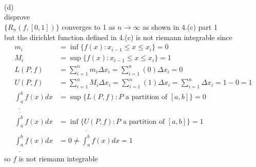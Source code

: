 \documentclass[12pt, border = 4pt, multi]{article} %
\begin{document}
\\
\\
\\
(d)\\
disprove\\
$\{R_n(f, [0, 1])\}$ converges to 1 as $n \rightarrow \infty$ as shown in 4.(c) part 1\\
but the dirichlet function defined in 4.(c) is not riemann integrable since
\begin{align*}
m_i &= \inf\{f(x): x_{i - 1} \leq x \leq x_i\} = 0\\
M_i &= \sup\{f(x): x_{i - 1} \leq x \leq x_i\} = 1\\
L(P, f) &= \sum_{i = 1} ^ n m_i \Delta x_i = \sum_{i = 1} ^ n (0)\Delta x_i = 0\\
U(P, f) &= \sum_{i = 1} ^ n M_i \Delta x_i = \sum_{i = 1} ^ n (1)\Delta x_i = \sum_{i = 1} ^ n \Delta x_i = 1 - 0 = 1\\
\underline{\int_a ^ b}f(x)dx &= \sup\{L(P, f): P \text{ a partition of }[a, b]\} = 0\\
\overline{\int_a ^ b}f(x)dx &= \inf\{U(P, f): P \text{ a partition of }[a, b]\} = 1\\
\underline{\int_a ^ b}f(x)dx &= 0 \not= \overline{\int_a ^ b}f(x)dx = 1
\end{align*}
so $f$ is not riemann integrable\\
\end{document}
